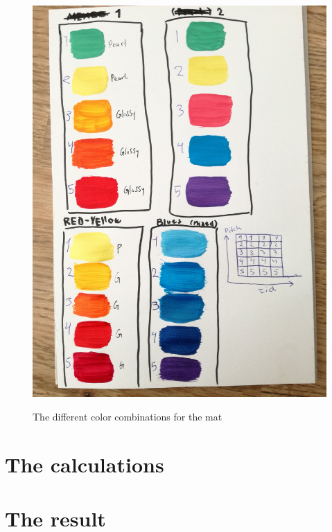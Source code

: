 \begin{figure}[H]
	\centering
	\includegraphics[width=0.5\linewidth]{figure/Design/colors}
	\label{fig:colors}
	\caption{The different color combinations for the mat}
	
\end{figure}

\section{The calculations}

\section{The result}













